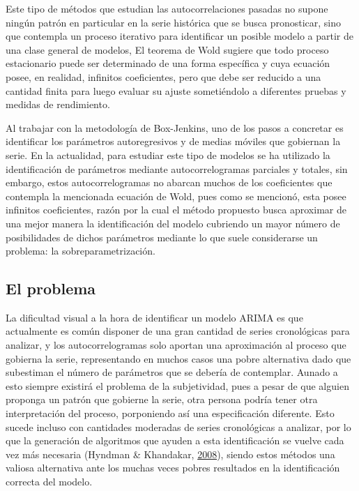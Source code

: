 \documentclass[
]{article}
\begin{document}
Este tipo de métodos que estudian las autocorrelaciones pasadas no
supone ningún patrón en particular en la serie histórica que se busca
pronosticar, sino que contempla un proceso iterativo para identificar un
posible modelo a partir de una clase general de modelos, El teorema de
Wold sugiere que todo proceso estacionario puede ser determinado de una
forma específica y cuya ecuación posee, en realidad, infinitos
coeficientes, pero que debe ser reducido a una cantidad finita para
luego evaluar su ajuste sometiéndolo a diferentes pruebas y medidas de
rendimiento.

Al trabajar con la metodología de Box-Jenkins, uno de los pasos a
concretar es identificar los parámetros autoregresivos y de medias
móviles que gobiernan la serie. En la actualidad, para estudiar este
tipo de modelos se ha utilizado la identificación de parámetros mediante
autocorrelogramas parciales y totales, sin embargo, estos
autocorrelogramas no abarcan muchos de los coeficientes que contempla la
mencionada ecuación de Wold, pues como se mencionó, esta posee infinitos
coeficientes, razón por la cual el método propuesto busca aproximar de
una mejor manera la identificación del modelo cubriendo un mayor número
de posibilidades de dichos parámetros mediante lo que suele considerarse
un problema: la sobreparametrización.

\subsection{El problema}

La dificultad visual a la hora de identificar un modelo ARIMA es que
actualmente es común disponer de una gran cantidad de series
cronológicas para analizar, y los autocorrelogramas solo aportan una
aproximación al proceso que gobierna la serie, representando en muchos
casos una pobre alternativa dado que subestiman el número de parámetros
que se debería de contemplar. Aunado a esto siempre existirá el problema
de la subjetividad, pues a pesar de que alguien proponga un patrón que
gobierne la serie, otra persona podría tener otra interpretación del
proceso, porponiendo así una especificación diferente. Esto sucede
incluso con cantidades moderadas de series cronológicas a analizar, por
lo que la generación de algoritmos que ayuden a esta identificación se
vuelve cada vez más necesaria (Hyndman \& Khandakar,
\protect\hyperlink{ref-auto.arima}{2008}), siendo estos métodos una
valiosa alternativa ante los muchas veces pobres resultados en la
identificación correcta del modelo.
\end{document}
